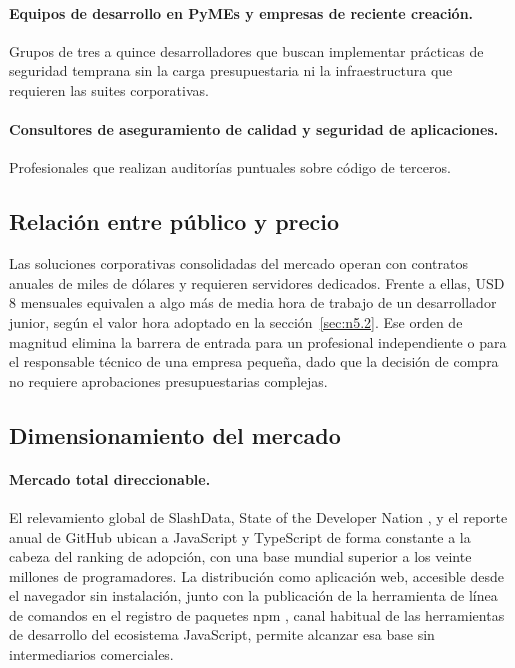\paragraph{Equipos de desarrollo en PyMEs y empresas de reciente creación.} Grupos de tres a quince desarrolladores que buscan implementar prácticas de seguridad temprana sin la carga presupuestaria ni la infraestructura que requieren las suites corporativas.

\paragraph{Consultores de aseguramiento de calidad y seguridad de aplicaciones.} Profesionales que realizan auditorías puntuales sobre código de terceros.

\subsection{Relación entre público y precio}\label{sec:n5.1.3}

Las soluciones corporativas consolidadas del mercado operan con contratos anuales de miles de dólares y requieren servidores dedicados. Frente a ellas, USD 8 mensuales equivalen a algo más de media hora de trabajo de un desarrollador junior, según el valor hora adoptado en la sección~\ref{sec:n5.2}. Ese orden de magnitud elimina la barrera de entrada para un profesional independiente o para el responsable técnico de una empresa pequeña, dado que la decisión de compra no requiere aprobaciones presupuestarias complejas.

\subsection{Dimensionamiento del mercado}\label{sec:n5.1.4}

\paragraph{Mercado total direccionable.} El relevamiento global de SlashData, State of the Developer Nation \citep{slashdata}, y el reporte anual de GitHub \citep{octoverse} ubican a JavaScript y TypeScript de forma constante a la cabeza del ranking de adopción, con una base mundial superior a los veinte millones de programadores. La distribución como aplicación web, accesible desde el navegador sin instalación, junto con la publicación de la herramienta de línea de comandos en el registro de paquetes npm \citep{npmregistry}, canal habitual de las herramientas de desarrollo del ecosistema JavaScript, permite alcanzar esa base sin intermediarios comerciales.

